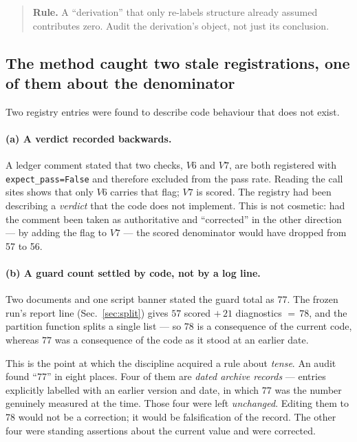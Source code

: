 \documentclass[11pt,a4paper]{article}
\newcommand{\code}[1]{\texttt{\small #1}}
\begin{document}
\begin{quote}\small
\textbf{Rule.} A ``derivation'' that only re-labels structure already assumed
contributes zero. Audit the derivation's object, not just its conclusion.
\end{quote}

\subsection{The method caught two stale registrations, one of them about the
denominator}
\label{sec:stale}

Two registry entries were found to describe code behaviour that does not exist.

\paragraph{(a) A verdict recorded backwards.} A ledger comment stated that two
checks, $V6$ and $V7$, are both registered with \code{expect_pass=False} and
therefore excluded from the pass rate. Reading the call sites shows that only
$V6$ carries that flag; $V7$ is scored. The registry had been describing a
\emph{verdict} that the code does not implement. This is not cosmetic: had the
comment been taken as authoritative and ``corrected'' in the other direction ---
by adding the flag to $V7$ --- the scored denominator would have dropped from
57 to 56.

\paragraph{(b) A guard count settled by code, not by a log line.} Two documents
and one script banner stated the guard total as 77. The frozen run's report line
(Sec.~\ref{sec:split}) gives $57$ scored $+\,21$ diagnostics $=\,78$, and the
partition function splits a single list --- so $78$ is a consequence of the
current code, whereas $77$ was a consequence of the code as it stood at an
earlier date.

This is the point at which the discipline acquired a rule about \emph{tense}. An
audit found ``77'' in eight places. Four of them are \emph{dated archive
records} --- entries explicitly labelled with an earlier version and date, in
which 77 was the number genuinely measured at the time. Those four were left
\emph{unchanged}. Editing them to 78 would not be a correction; it would be
falsification of the record. The other four were standing assertions about the
current value and were corrected.
\end{document}

